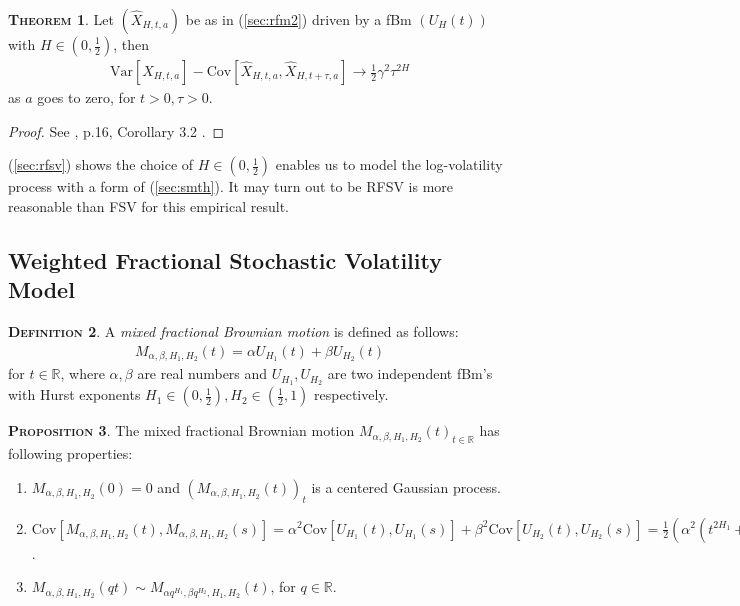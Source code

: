 \documentclass[a4paper, twoside, 11pt]{article}
\theoremstyle{definition}
\newtheorem{definition}{\scshape Definition}[section]
\newtheorem{theorem}[definition]{\scshape Theorem}
\newtheorem{proposition}[definition]{\scshape Proposition}
\newcommand{\brkt}[1]{\left({#1} \right)}
\begin{document}
\begin{theorem}
  Let $(\hat{X}_{H, t, a})$ be as in (\ref{sec:rfm2}) driven by a fBm $(U_H(t))$ with $H\in(0, \frac{1}{2})$, then 
  \begin{eqnarray}
	\mathrm{Var}[\hat{X}_{H,t, a}] - \mathrm{Cov}[\hat{X}_{H,t, a}, \hat{X}_{H,t+\tau, a}] \rightarrow \frac{1}{2} \gamma^2\tau^{2H}
	\label{sec:rfsv}
  \end{eqnarray}
 as $a$ goes to zero, for $t>0, \tau>0$.
\end{theorem}
\begin{proof}
  See \cite{gradin}, p.16, Corollary 3.2 .
\end{proof}

(\ref{sec:rfsv}) shows the choice of $H\in(0,\frac{1}{2})$ enables us to model the log-volatility process with a form of (\ref{sec:smth}). It may turn out to be RFSV is more reasonable than FSV for this empirical result.

\subsection{Weighted Fractional Stochastic Volatility Model}
\begin{definition}
  A \emph{mixed fractional Brownian motion} is defined as follows:
\begin{eqnarray}
  M_{\alpha,\beta,H_1,H_2}(t) = \alpha U_{H_1}(t) + \beta U_{H_2}(t)
  \label{sec:mfsv}
\end{eqnarray}
for $t\in \mathbb{R}$, where $\alpha, \beta$ are real numbers and $U_{H_1}, U_{H_2}$ are two independent fBm's with Hurst exponents $H_1 \in (0, \frac{1}{2}), H_2 \in (\frac{1}{2}, 1)$ respectively.
\end{definition}

\begin{proposition}
  The mixed fractional Brownian motion $M_{\alpha,\beta,H_1,H_2}(t)_{t\in\mathbb{R}}$ has following properties:
   \begin{enumerate}[topsep=0pt, itemsep=-1ex, partopsep=1ex, parsep=1ex, label=(\roman*)]
	 \item $M_{\alpha,\beta,H_1,H_2}(0) = 0$ and $(M_{\alpha,\beta,H_1,H_2}(t))_t$ is a centered Gaussian  process.
	 \item $\mathrm{Cov}[M_{\alpha,\beta,H_1,H_2}(t), M_{\alpha,\beta,H_1,H_2}(s)] = \alpha^2 \mathrm{Cov}[U_{H_1}(t), U_{H_1}(s)] + \beta^2\mathrm{Cov}[U_{H_2}(t), U_{H_2}(s)] = \frac{1}{2}\brkt{\alpha^2(t^{2H_1}+s^{2H_1}+|t-s|^{2H_1}) + \beta^2(t^{2H_2} + s^{2H_2} + |t-s|^{2H_2})}$. 
	 \item $M_{\alpha, \beta, H_1, H_2}(qt) \sim M_{\alpha q^{H_1}, \beta q^{H_2}, H_1, H_2}(t)$, for $q\in\mathbb{R}$.
	 \end{enumerate}
	 \label{sec:prop}
\end{proposition}
\end{document}
